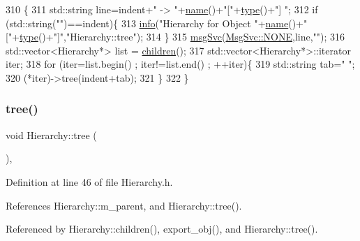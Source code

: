 \begin{DoxyCode}
310                                     \{
311   std::string line=indent+\textcolor{stringliteral}{" -> "}+\hyperlink{classObject_a300f4c05dd468c7bb8b3c968868443c1}{name}()+\textcolor{stringliteral}{"["}+\hyperlink{classObject_a84f99f70f144a83e1582d1d0f84e4e62}{type}()+\textcolor{stringliteral}{"] "};
312   \textcolor{keywordflow}{if} (std::string(\textcolor{stringliteral}{""})==indent)\{
313     \hyperlink{classObject_a644fd329ea4cb85f54fa6846484b84a8}{info}(\textcolor{stringliteral}{"Hierarchy for Object "}+\hyperlink{classObject_a300f4c05dd468c7bb8b3c968868443c1}{name}()+\textcolor{stringliteral}{"["}+\hyperlink{classObject_a84f99f70f144a83e1582d1d0f84e4e62}{type}()+\textcolor{stringliteral}{"]"},\textcolor{stringliteral}{"Hierarchy::tree"});
314   \}
315   \hyperlink{classObject_a3f9d5537ebce0c0f2bf6ae4d92426f3c}{msgSvc}(\hyperlink{classMsgSvc_ae671eb7301996cd049d2da8a65925926a9be9ae32fed8e1e6eba4a58692210fbd}{MsgSvc::NONE},line,\textcolor{stringliteral}{""});
316   std::vector<Hierarchy*> list = \hyperlink{classHierarchy_aa9a76f69e98e052ee1a6e32cea006288}{children}();
317   std::vector<Hierarchy*>::iterator iter;
318   \textcolor{keywordflow}{for} (iter=list.begin() ; iter!=list.end() ; ++iter)\{
319     std::string tab=\textcolor{stringliteral}{"  "};
320     (*iter)->tree(indent+tab);
321   \}
322 \}
\end{DoxyCode}
\mbox{\label{classHierarchy_a594c294c5f60c230e106d522ed008212}} 
\subsubsection{\texorpdfstring{tree()}{tree()}\hspace{0.1cm}{\footnotesize\ttfamily [2/2]}}
{\footnotesize\ttfamily void Hierarchy\+::tree (\begin{DoxyParamCaption}{ }\end{DoxyParamCaption})\hspace{0.3cm}{\ttfamily [inline]}, {\ttfamily [inherited]}}



Definition at line 46 of file Hierarchy.\+h.



References Hierarchy\+::m\+\_\+parent, and Hierarchy\+::tree().



Referenced by Hierarchy\+::children(), export\+\_\+obj(), and Hierarchy\+::tree().


